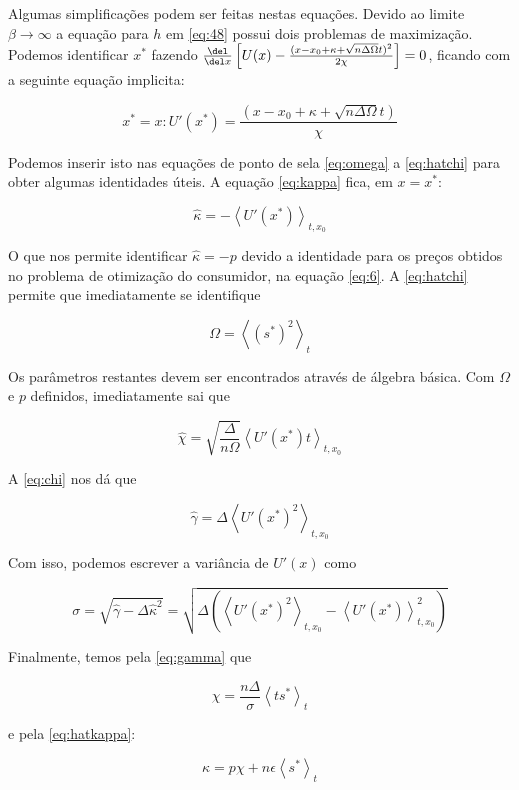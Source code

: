 Algumas simplificações podem ser feitas nestas equações. Devido ao
limite $\beta \to \infty$ a equação para $h$ em \eqref{eq:48} possui
dois problemas de maximização. Podemos identificar $x^*$ fazendo
$\frac{\del}{\del x} \left[U(x) - \frac{(x - x_0 + \kappa +
    \sqrt{n\Delta\Omega}t)^2}{2\chi}\right] = 0$, ficando com a
seguinte equação implicita:

\begin{equation}
  \label{eq:55}
  x^* = x : U'(x^*) = \frac{(x - x_0 + \kappa +
      \sqrt{n\Delta\Omega}t)}{\chi}
\end{equation}

Podemos inserir isto nas equações de ponto de sela \eqref{eq:omega} a
\eqref{eq:hatchi} para obter algumas identidades úteis. A equação
\eqref{eq:kappa} fica, em $x = x^*$:

\begin{equation}
  \label{eq:56}
  \hat{\kappa} = -\left \langle U'(x^*) \right \rangle_{t,x_0}
\end{equation}

O que nos permite identificar $\hat{\kappa} = -p$ devido a identidade
para os preços obtidos no problema de otimização do consumidor, na
equação \eqref{eq:6}. A \eqref{eq:hatchi} permite que imediatamente se
identifique 

\begin{equation}
  \label{eq:57}
\Omega = \left\langle (s^*)^2 \right\rangle_t
\end{equation}

Os parâmetros restantes devem ser encontrados através de álgebra
básica. Com $\Omega$ e $p$ definidos, imediatamente sai que


\begin{equation}
  \label{eq:58}
\hat{\chi} = \sqrt{\frac{\Delta}{n\Omega}} \left \langle U'(x^*) t
\right \rangle_{t,x_0}
\end{equation}

 A \eqref{eq:chi} nos dá que 

 \begin{equation}
   \label{eq:59}
\hat{\gamma} =
\Delta \left \langle U'(x^*)^2 \right \rangle_{t,x_0}
\end{equation}

Com isso, podemos escrever a variância de $U'(x)$ como 

\begin{equation}
  \label{eq:60}
\sigma = \sqrt{\hat{\gamma} - \Delta \hat{\kappa}^2} = \sqrt{\Delta
    \left(\left \langle U'(x^*)^2 \right \rangle_{t,x_0} - \left
        \langle U'(x^*) \right \rangle_{t,x_0}^2 \right)}
\end{equation}


Finalmente, temos pela
  \eqref{eq:gamma} que

  \begin{equation}
    \label{eq:61}
    \chi = \frac{n\Delta}{\sigma} \left \langle t s^* \right \rangle_t
  \end{equation}

e pela \eqref{eq:hatkappa}:

\begin{equation}
  \label{eq:62}
  \kappa = p \chi + n\epsilon \left \langle s^* \right \rangle_t
\end{equation}
